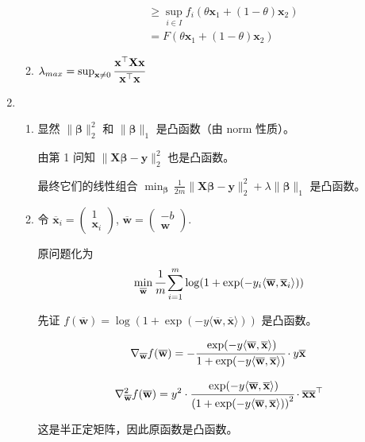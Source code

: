 \documentclass[11pt,letter,notitlepage]{article}
\theoremstyle{definition}
\begin{document}
\begin{solution}
\begin{enumerate}
\begin{enumerate}
$$\begin{aligned}
					             & \geq \sup_{i\in I} f_i(\theta\mathbf{x}_1+(1-\theta)\mathbf{x}_2)                       \\
					             & = F(\theta\mathbf{x}_1+(1-\theta)\mathbf{x}_2)
				            \end{aligned}$$
			      \item $\lambda_{max}=\sup_{\mathbf{x}\neq 0} \cfrac{\mathbf{x}^\top \mathbf{X} \mathbf{x}}{\mathbf{x}^\top\mathbf{x}}$
		      \end{enumerate}
		\item \begin{enumerate}
			      \item 显然 $\|\mathbf{\beta}\|_2^2$ 和 $\|\mathbf{\beta}\|_1$ 是凸函数（由 norm 性质）。

			            由第 1 问知 $\|\mathbf{X}\mathbf{\beta}-\mathbf{y}\|_2^2$ 也是凸函数。

			            最终它们的线性组合 $\min_{\boldsymbol{\beta}}\,\frac{1}{2m}\|\mathbf{X}\boldsymbol{\beta}-\mathbf{y}\|_2^2+\lambda\|\boldsymbol{\beta}\|_1$ 是凸函数。
			      \item 令 $\overline{\mathbf{x}}_i=\begin{pmatrix}
					            1 \\\mathbf{x}_i
				            \end{pmatrix}$, $\overline{\mathbf{w}}=\begin{pmatrix}
					            -b \\\mathbf{w}
				            \end{pmatrix}$.

			            原问题化为 $$\min_{\overline{\mathbf{w}}} \cfrac{1}{m} \sum_{i=1}^m \log (1+\exp(-y_i\langle \overline{\mathbf{w}},  \overline{\mathbf{x}}_i \rangle))$$

			            先证 $f(\overline{\mathbf{w}})=\log (1+\exp(-y\langle \overline{\mathbf{w}},  \overline{\mathbf{x}} \rangle))$ 是凸函数。

			            $$\nabla_{\overline{\mathbf{w}}} f(\overline{\mathbf{w}})
				            =-\cfrac{\exp(-y\langle \overline{\mathbf{w}},  \overline{\mathbf{x}} \rangle)}{1+\exp(-y\langle \overline{\mathbf{w}},  \overline{\mathbf{x}} \rangle)}\cdot y\overline{\mathbf{x}}$$

			            $$\nabla^2_{\overline{\mathbf{w}}} f(\overline{\mathbf{w}})
				            =y^2\cdot\cfrac{\exp(-y\langle \overline{\mathbf{w}},  \overline{\mathbf{x}} \rangle)}{\left(1+\exp(-y\langle \overline{\mathbf{w}},  \overline{\mathbf{x}} \rangle)\right)^2}\cdot \overline{\mathbf{x}}\overline{\mathbf{x}}^\top$$

			            这是半正定矩阵，因此原函数是凸函数。

		      \end{enumerate}
	\end{enumerate}
\end{solution}

\end{document}
